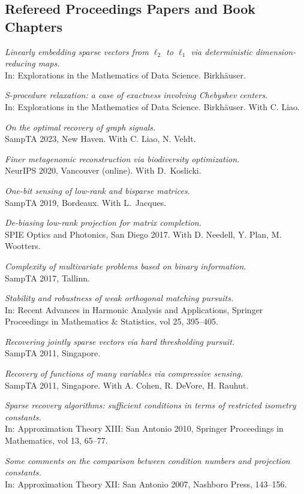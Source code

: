 \documentclass[11pt]{article}
\begin{document}
\subsection{Refereed Proceedings Papers and Book Chapters}
\betaremune
\item {\sl Linearly embedding sparse vectors from $\ell_2$ to $\ell_1$
via deterministic dimension-reducing maps.}\\
In: Explorations in the Mathematics of Data Science. Birkh\"auser.
\item {\sl S-procedure relaxation: a case of exactness involving Chebyshev centers}.\\
In: Explorations in the Mathematics of Data Science. Birkh\"auser. With C. Liao.
\item {\sl On the optimal recovery of graph signals.}\\
SampTA 2023, New Haven.  With C. Liao, N. Veldt.
\item {\sl Finer metagenomic reconstruction via biodiversity optimization.}\\
NeurIPS 2020, Vancouver (online).
With D.~Koslicki.
\item {\sl One-bit sensing of low-rank and bisparse matrices}.\\
SampTA 2019, Bordeaux. With L.~Jacques.
\item {\sl De-biasing low-rank projection for matrix completion.}\\
SPIE Optics and Photonics, San Diego 2017.
With D. Needell, Y. Plan, M. Wootters.
\item {\sl Complexity of multivariate problems based on binary information}.\\
SampTA 2017, Tallinn.
\item {\sl Stability and robustness of weak orthogonal matching pursuits.}\\
In: Recent Advances in Harmonic Analysis and  Applications,
Springer Proceedings in Mathematics \& Statistics, vol 25, 395--405.
\item {\sl Recovering jointly sparse vectors via hard thresholding pursuit.}\\ 
SampTA 2011, Singapore.
\item {\sl Recovery of functions of many variables via compressive sensing.}\\
SampTA 2011, Singapore. 
With A. Cohen, R. DeVore, H. Rauhut.
\item {\sl Sparse recovery algorithms: sufficient conditions in terms of restricted isometry constants.}\\
In: Approximation Theory XIII: San Antonio 2010, Springer Proceedings in Mathematics, vol 13, 65--77.
\item {\sl  Some comments on the comparison between condition numbers and projection constants.}\\
In: Approximation Theory XII: San Antonio 2007, Nashboro Press, 143--156. 
\eetaremune
\end{document}
